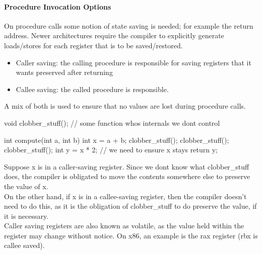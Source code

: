 \paragraph{Procedure Invocation Options}
On procedure calls some notion of state saving is needed; for example the return address. Newer architectures require the compiler to explicitly generate loads/stores for each register that is to be saved/restored.
\begin{itemize}
    \item Caller saving: the calling procedure is responsible for saving registers that it wants preserved after returning
    \item Callee saving: the called procedure is responsible.
\end{itemize}
A mix of both is used to ensure that no values are lost during procedure calls.
\begin{ccode}
void clobber_stuff(); // some function whos internals we dont control

int compute(int a, int b) {
  int x = a + b;
  clobber_stuff();
  clobber_stuff();
  clobber_stuff();
  int y = x * 2; // we need to ensure x stays
  return y;
}
\end{ccode}
Suppose x is in a caller-saving register. Since we dont know what clobber\_stuff does, the compiler is obligated to move the contents somewhere else to preserve the value of x. \\
On the other hand, if x is in a callee-saving register, then the compiler doesn't need to do this, as it is the obligation of clobber\_stuff to do preserve the value, if it is necessary.\\
Caller saving registers are also known as volatile, as the value held within the register may change without notice. On x86, an example is the rax register (rbx is callee saved).
